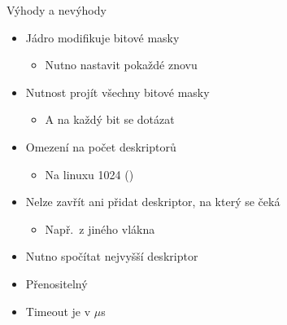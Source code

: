 \begin{frame}{Výhody a nevýhody }

  \begin{itemize}
    \item Jádro modifikuje bitové masky
    \begin{itemize}
      \item Nutno nastavit pokaždé znovu
    \end{itemize}

    \pause

    \item Nutnost projít všechny bitové masky
    \begin{itemize}
      \item A na každý bit se dotázat 
    \end{itemize}

    \pause

    \item Omezení na počet deskriptorů
    \begin{itemize}
      \item Na linuxu 1024 ()
    \end{itemize}

    \pause

    \item Nelze zavřít ani přidat deskriptor, na který se čeká
    \begin{itemize}
      \item Např.\ z jiného vlákna
    \end{itemize}

    \pause

    \item Nutno spočítat nejvyšší deskriptor
  \end{itemize}

  \pause

  \begin{itemize}
    \item Přenositelný

    \pause

    \item Timeout je v $\mu$s
  \end{itemize}

\end{frame}

